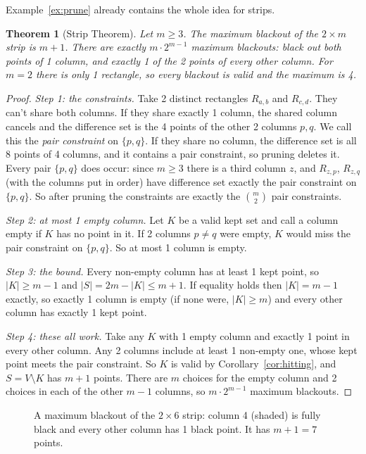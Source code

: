 \documentclass[11pt]{article}
\newtheorem{theorem}{Theorem}[section]
\theoremstyle{definition}
\theoremstyle{remark}
\begin{document}
Example~\ref{ex:prune} already contains the whole idea for strips.

\begin{theorem}[Strip Theorem]\label{thm:strip}
Let $m\ge3$. The maximum blackout of the $2\times m$ strip is $m+1$. There are exactly
$m\cdot2^{m-1}$ maximum blackouts: black out both points of 1 column, and exactly 1 of the 2
points of every other column. For $m=2$ there is only 1 rectangle, so every blackout is valid
and the maximum is 4.
\end{theorem}

\begin{proof}
\emph{Step 1: the constraints.} Take 2 distinct rectangles $R_{a,b}$ and $R_{c,d}$. They can't
share both columns. If they share exactly 1 column, the shared column cancels and the difference
set is the 4 points of the other 2 columns $p,q$. We call this the \emph{pair constraint} on
$\{p,q\}$. If they share no column, the difference set is all 8 points of 4 columns, and it
contains a pair constraint, so pruning deletes it. Every pair $\{p,q\}$ does occur: since
$m\ge3$ there is a third column $z$, and $R_{z,p}$, $R_{z,q}$ (with the columns put in order)
have difference set exactly the pair constraint on $\{p,q\}$. So after pruning the constraints
are exactly the $\binom m2$ pair constraints.

\emph{Step 2: at most 1 empty column.} Let $K$ be a valid kept set and call a column empty if
$K$ has no point in it. If 2 columns $p\ne q$ were empty, $K$ would miss the pair constraint on
$\{p,q\}$. So at most 1 column is empty.

\emph{Step 3: the bound.} Every non-empty column has at least 1 kept point, so
$|K|\ge m-1$ and $|S|=2m-|K|\le m+1$. If equality holds then $|K|=m-1$ exactly, so exactly 1
column is empty (if none were, $|K|\ge m$) and every other column has exactly 1 kept point.

\emph{Step 4: these all work.} Take any $K$ with 1 empty column and exactly 1 point in every
other column. Any 2 columns include at least 1 non-empty one, whose kept point meets the pair
constraint. So $K$ is valid by Corollary~\ref{cor:hitting}, and $S=V\setminus K$ has $m+1$
points. There are $m$ choices for the empty column and 2 choices in each of the other $m-1$
columns, so $m\cdot2^{m-1}$ maximum blackouts.
\end{proof}

\begin{figure}[htbp]
\centering

\caption{A maximum blackout of the $2\times6$ strip: column 4 (shaded) is fully black and every
other column has 1 black point. It has $m+1=7$ points.}
\label{fig:stripmax}
\end{figure}
\end{document}
